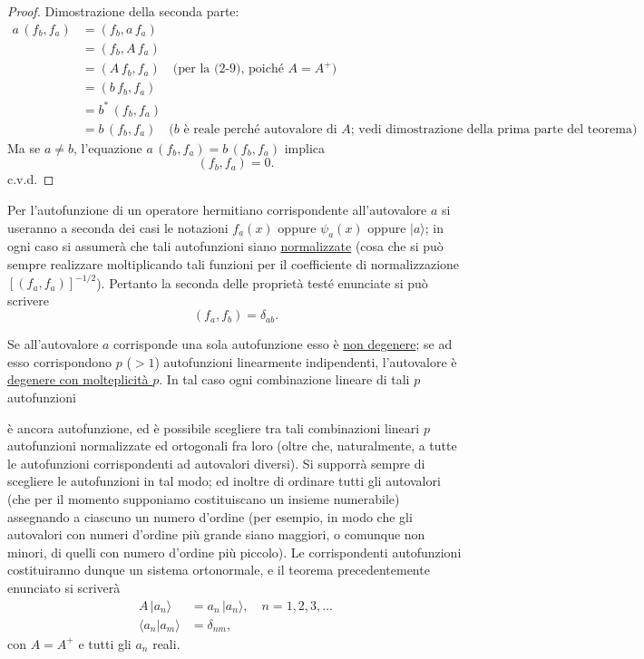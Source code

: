 \documentclass[11pt, a4paper]{book}
\numberwithin{equation}{section}
\begin{document}
\begin{proof}
Dimostrazione della seconda parte:
\begin{align*}
a\,(f_b, f_a) &= (f_b, a\,f_a) \\
  &= (f_b, A\,f_a) \\
  &= (A\,f_b, f_a) \quad \text{(per la (2-9), poiché }A=A^+\text{)} \\
  &= (b\,f_b, f_a) \\
  &= b^*\,(f_b, f_a) \\
  &= b\,(f_b, f_a) \quad \text{($b$ è reale perché autovalore di $A$;
    vedi dimostrazione della prima parte del teorema)}.
\end{align*}
Ma se $a \neq b$, l'equazione $a\,(f_b, f_a) = b\,(f_b, f_a)$ implica
\[
(f_b, f_a) = 0.
\]
c.v.d.
\end{proof}

Per l'autofunzione di un operatore hermitiano corrispondente all'autovalore
$a$ si useranno a seconda dei casi le notazioni $f_a(x)$ oppure
$\psi_a(x)$ oppure $|a\rangle$; in ogni caso si assumerà che tali
autofunzioni siano \underline{normalizzate} (cosa che si può sempre
realizzare moltiplicando tali funzioni per il coefficiente di
normalizzazione $[(f_a, f_a)]^{-1/2}$). Pertanto la seconda delle
proprietà testé enunciate si può scrivere
\begin{equation}
(f_a, f_b) = \delta_{ab}.
\end{equation}

Se all'autovalore $a$ corrisponde una sola autofunzione esso è
\underline{non degenere}; se ad esso corrispondono $p$ ($>1$) autofunzioni
linearmente indipendenti, l'autovalore è \underline{degenere con
molteplicità $p$}. In tal caso ogni combinazione lineare di tali $p$
autofunzioni


è ancora autofunzione, ed è possibile scegliere tra tali combinazioni
lineari $p$ autofunzioni normalizzate ed ortogonali fra loro (oltre che,
naturalmente, a tutte le autofunzioni corrispondenti ad autovalori
diversi). Si supporrà sempre di scegliere le autofunzioni in tal modo; ed
inoltre di ordinare tutti gli autovalori (che per il momento supponiamo
costituiscano un insieme numerabile) assegnando a ciascuno un numero
d'ordine (per esempio, in modo che gli autovalori con numeri d'ordine più
grande siano maggiori, o comunque non minori, di quelli con numero
d'ordine più piccolo). Le corrispondenti autofunzioni costituiranno dunque
un sistema ortonormale, e il teorema precedentemente enunciato si scriverà
\begin{align}
A\,|a_n\rangle &= a_n\,|a_n\rangle, \quad n=1,2,3,\ldots \tag{3} \\
\langle a_n|a_m\rangle &= \delta_{nm}, \tag{4}
\end{align}
con $A=A^+$ e tutti gli $a_n$ reali.
\end{document}
